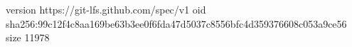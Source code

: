 version https://git-lfs.github.com/spec/v1
oid sha256:99c12f4c8aa169be63b3ee0f6fda47d5037c8556bfc4d359376608c053a9ce56
size 11978
